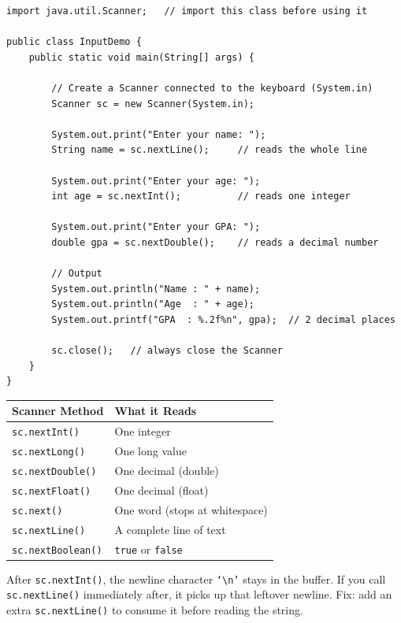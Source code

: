 \documentclass[12pt,a4paper,oneside]{book}
\begin{document}
\begin{lstlisting}[caption={Reading User Input with Scanner}]
import java.util.Scanner;   // import this class before using it

public class InputDemo {
    public static void main(String[] args) {

        // Create a Scanner connected to the keyboard (System.in)
        Scanner sc = new Scanner(System.in);

        System.out.print("Enter your name: ");
        String name = sc.nextLine();     // reads the whole line

        System.out.print("Enter your age: ");
        int age = sc.nextInt();          // reads one integer

        System.out.print("Enter your GPA: ");
        double gpa = sc.nextDouble();    // reads a decimal number

        // Output
        System.out.println("Name : " + name);
        System.out.println("Age  : " + age);
        System.out.printf("GPA  : %.2f%n", gpa);  // 2 decimal places

        sc.close();   // always close the Scanner
    }
}
\end{lstlisting}

\begin{center}
\begin{tabular}{ll}
\toprule
\textbf{Scanner Method} & \textbf{What it Reads}\\
\midrule
\texttt{sc.nextInt()}      & One integer\\
\texttt{sc.nextLong()}     & One long value\\
\texttt{sc.nextDouble()}   & One decimal (double)\\
\texttt{sc.nextFloat()}    & One decimal (float)\\
\texttt{sc.next()}         & One word (stops at whitespace)\\
\texttt{sc.nextLine()}     & A complete line of text\\
\texttt{sc.nextBoolean()}  & \texttt{true} or \texttt{false}\\
\bottomrule
\end{tabular}
\end{center}

\begin{warningbox}
After \texttt{sc.nextInt()}, the newline character \texttt{`\textbackslash n'} stays in the buffer. If you call \texttt{sc.nextLine()} immediately after, it picks up that leftover newline. Fix: add an extra \texttt{sc.nextLine()} to consume it before reading the string.
\end{warningbox}
\end{document}
